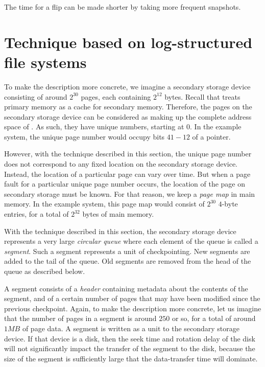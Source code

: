 The time for a flip can be made shorter by taking more frequent
snapshots.


\section{Technique based on log-structured file systems}

To make the description more concrete, we imagine a secondary storage
device consisting of around $2^{30}$ pages, each containing $2^{12}$
bytes.  Recall that \sysname{} treats primary memory as a cache for
secondary memory.  Therefore, the pages on the secondary storage
device can be considered as making up the complete address space of
\sysname{}.  As such, they have unique numbers, starting at $0$.
In the example system, the unique page number would occupy bits $41 -
12$ of a pointer.

However, with the technique described in this section, the unique page
number does not correspond to any fixed location on the secondary
storage device.  Instead, the location of a particular page can vary
over time.  But when a page fault for a particular unique page number
occurs, the location of the page on secondary storage must be known.
For that reason, we keep a \emph{page map} in main memory.  In the
example system, this page map would consist of $2^{30}$ $4$-byte
entries, for a total of $2^{32}$ bytes of main memory.

With the technique described in this section, the secondary storage
device represents a very large \emph{circular queue} where each
element of the queue is called a \emph{segment}.  Such a segment
represents a unit of checkpointing.  New segments are added to the
tail of the queue.  Old segments are removed from the head of the
queue as described below.

A segment consists of a \emph{header} containing metadata about the
contents of the segment, and of a certain number of pages that may
have been modified since the previous checkpoint.  Again, to make the
description more concrete, let us imagine that the number of pages in
a segment is around $250$ or so, for a total of around $1MB$ of page
data.  A segment is written as a unit to the secondary storage device.
If that device is a disk, then the seek time and rotation delay of the
disk will not significantly impact the transfer of the segment to the
disk, because the size of the segment is sufficiently large that the
data-transfer time will dominate.

